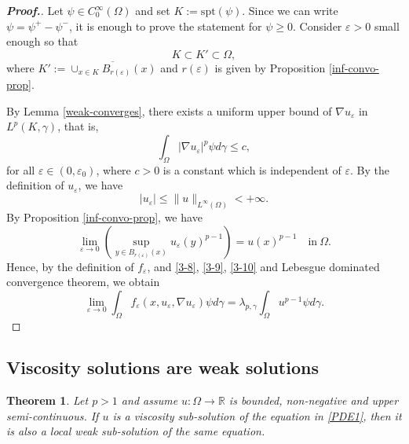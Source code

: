 \documentclass[12pt]{amsart}
\newtheorem{theorem}{Theorem}[section]
\newcommand{\R}{\mathbb R}
\newcommand{\1}{\mathbf 1}
\begin{document}
\begin{proof}[\bf Proof.] Let $\psi \in C^{\infty}_0(\Omega)$ and set $K:=\mathrm{spt}(\psi)$. Since we can write $\psi=\psi^{+}-\psi^{-}$, it is enough to prove the statement for $\psi\geq 0$. Consider $\varepsilon>0$ small enough so that
\[
K \subset K' \subset \Omega,
\]
where $K':= \overline{\cup_{x\in K}B_{r(\varepsilon)}(x)}$ and $r(\varepsilon)$ is given by Proposition \ref{inf-convo-prop}.

By Lemma \ref{weak-converges}, there exists a uniform upper bound of $\nabla u_\varepsilon$ in $L^{p}(K,\gamma)$, that is,
\begin{equation}\label{3-8}
\int_{\Omega}  |\nabla u_\varepsilon|^{p}\psi d\gamma \leq c,
\end{equation}
for all $\varepsilon \in (0,\varepsilon_0)$, where $c>0$ is a constant which is independent of $\varepsilon$. By the definition of $u_\varepsilon$, we have
\begin{equation}\label{3-9}
|u_\varepsilon|\leq \|u\|_{L^{\infty}(\Omega)}<+\infty.
\end{equation}
{  By
Proposition \ref{inf-convo-prop}, we have
\begin{equation}\label{3-10}
\mathop{\lim}_{\varepsilon \rightarrow 0}  \left({\sup}_{y\in B_{r(\varepsilon)}(x)} u_\varepsilon(y)^{p-1}\right) = u(x)^{p-1}\quad \mathrm{in}\ \Omega.
\end{equation}}
Hence, by the definition of $f_\varepsilon$, and \eqref{3-8}, \eqref{3-9}, \eqref{3-10} and Lebesgue dominated convergence theorem, we obtain
\[
\mathop{\lim}_{\varepsilon \rightarrow 0} \int_{\Omega} f_\varepsilon(x,u_\varepsilon,\nabla u_\varepsilon) \psi d\gamma=\lambda_{p,\gamma} \int_{\Omega}u^{p-1}\psi d\gamma.
\]
\end{proof}

\subsection{Viscosity solutions are weak solutions}

\begin{theorem}\label{Viscosity-weak}
Let $p>1$ and assume $u:\Omega \rightarrow \R$ is bounded, non-negative and upper semi-continuous. If $u$ is a viscosity sub-solution of the equation in \eqref{PDE1}, then it is also a local weak sub-solution of the same equation.
\end{theorem}
\end{document}
